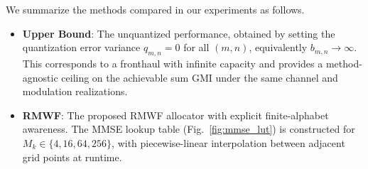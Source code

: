 \documentclass[10pt, twocolumn, comsoc]{IEEEtran}
\begin{document}
We summarize the methods compared in our experiments as follows.
\begin{itemize}
    \item \textbf{Upper Bound}: The unquantized performance, obtained by setting the quantization error variance $q_{m,n} = 0$ for all $(m,n)$, equivalently $b_{m,n} \to \infty$. 
    This corresponds to a fronthaul with infinite capacity and provides a method-agnostic ceiling on the achievable sum GMI under the same channel and modulation realizations.
    

    \item \textbf{RMWF}:
    The proposed RMWF allocator with explicit finite-alphabet awareness. The MMSE lookup table (Fig.~\ref{fig:mmse_lut}) is constructed for $M_k \in \{4, 16, 64, 256\}$, with piecewise-linear interpolation between adjacent grid points at runtime. 

    

\end{itemize}
\end{document}
